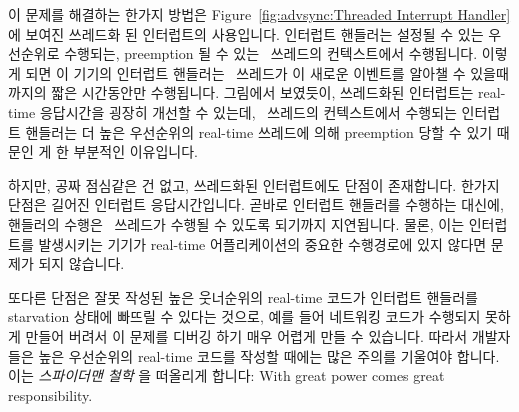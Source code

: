 이 문제를 해결하는 한가지 방법은
Figure~\ref{fig:advsync:Threaded Interrupt Handler} 에 보여진 쓰레드화 된 인터럽트의
사용입니다.
인터럽트 핸들러는 설정될 수 있는 우선순위로 수행되는, preemption 될 수 있는
\IRQ\ 쓰레드의 컨텍스트에서 수행됩니다.
이렇게 되면 이 기기의 인터럽트 핸들러는 \IRQ\ 쓰레드가 이 새로운 이벤트를
알아챌 수 있을때까지의 짧은 시간동안만 수행됩니다.
그림에서 보였듯이, 쓰레드화된 인터럽트는 real-time 응답시간을 굉장히 개선할 수
있는데, \IRQ\ 쓰레드의 컨텍스트에서 수행되는 인터럽트 핸들러는 더 높은
우선순위의 real-time 쓰레드에 의해 preemption 당할 수 있기 때문인 게 한
부분적인 이유입니다.

하지만, 공짜 점심같은 건 없고, 쓰레드화된 인터럽트에도 단점이 존재합니다.
한가지 단점은 길어진 인터럽트 응답시간입니다.
곧바로 인터럽트 핸들러를 수행하는 대신에, 핸들러의 수행은 \IRQ\ 쓰레드가 수행될
수 있도록 되기까지 지연됩니다.
물론, 이는 인터럽트를 발생시키는 기기가 real-time 어플리케이션의 중요한
수행경로에 있지 않다면 문제가 되지 않습니다.

또다른 단점은 잘못 작성된 높은 웃너순위의 real-time 코드가 인터럽트 핸들러를
starvation 상태에 빠뜨릴 수 있다는 것으로, 예를 들어 네트워킹 코드가 수행되지
못하게 만들어 버려서 이 문제를 디버깅 하기 매우 어렵게 만들 수 있습니다.
따라서 개발자들은 높은 우선순위의 real-time 코드를 작성할 때에는 많은 주의를
기울여야 합니다.
이는 \emph{스파이더맨 철학} 을 떠올리게 합니다: With great power comes great
responsibility.

